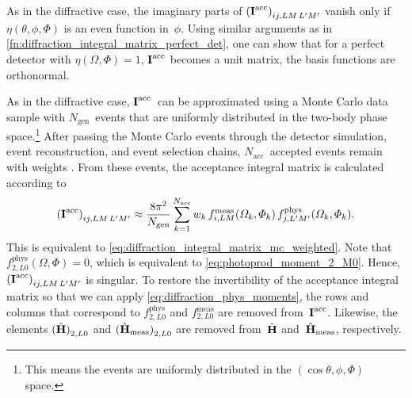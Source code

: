 As in the diffractive case, the imaginary parts of
$\rBrk[0]{\mat{I}^\text{acc}}_{i j, L M\, L' M'}$ vanish only if
$\eta(\theta, \phi, \Phi)$ is an even function in~$\phi$.  Using
similar arguments as in
\cref{fn:diffraction_integral_matrix_perfect_det}, one can show that
for a perfect detector with $\eta(\Omega, \Phi) = 1$,
$\bm{\mathrm{I}}^\text{acc}$ becomes a unit matrix, \ie the basis functions
are orthonormal.

As in the diffractive case, $\bm{\mathrm{I}}^\text{acc}$~can be approximated
using a Monte Carlo data sample with $N_\text{gen}$~events that are
uniformly distributed in the two-body phase space.\footnote{This means
the events are uniformly distributed in the $(\cos\theta, \phi, \Phi)$
space.}  After passing the Monte Carlo events through the detector
simulation, event reconstruction, and event selection chains,
$N_\text{acc}$~accepted events remain with weights .  From
these events, the acceptance integral matrix is calculated according
to
\begin{equation}
  \label{eq:photoprod_integral_matrix_mc_weighted}
  \rBrk[0]{\mat{I}^\text{acc}}_{i j, L M\, L' M'}
  \approx \frac{8 \pi^2}{N_\text{gen}} \sum_{k = 1}^{N_\text{acc}} w_k\,
  f_{i, L M}^\text{meas}(\Omega_k, \Phi_k)\,
  f_{j, L' M'}^\text{phys}(\Omega_k, \Phi_k).
\end{equation}
This is equivalent to
\cref{eq:diffraction_integral_matrix_mc_weighted}.  Note that
$f^\text{phys}_{2, L 0}(\Omega, \Phi) = 0$, which is equivalent to
\cref{eq:photoprod_moment_2_M0}.  Hence,
$\rBrk[0]{\mat{I}^\text{acc}}_{i j, L M\, L' M'}$ is singular.  To
restore the invertibility of the acceptance integral matrix so that we
can apply \cref{eq:diffraction_phys_moments}, the rows and columns
that correspond to $f^\text{phys}_{2, L 0}$ and $f^\text{meas}_{2, L
0}$ are removed from~$\bm{\mathrm{I}}^\text{acc}$.  Likewise, the elements
$\rBrk[0]{\hat{\vect{H}}}_{2, L 0}$ and
$\rBrk[0]{\hat{\vect{H}}_\text{meas}}_{2, L 0}$ are removed
from~$\hat{\bm{\mathrm{H}}}$ and~$\hat{\bm{\mathrm{H}}}_\text{meas}$, respectively.

